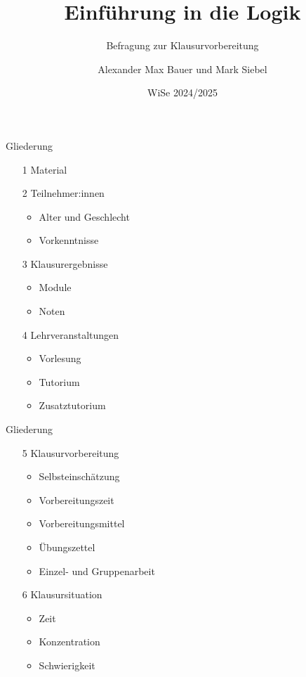 \documentclass[xcolor=table,9pt,aspectratio=169]{beamer}
\title{Einführung in die Logik}
\subtitle{Befragung zur Klausurvorbereitung}
\author{Alexander Max Bauer und Mark Siebel}
\date{WiSe 2024/2025}
\begin{document}
{
\begin{frame}
   \maketitle
\end{frame}
}


\begin{frame}{\vspace*{10mm}Gliederung}
\begin{itemize}
   \item[1] Material
   \item[2] Teilnehmer:innen
   \begin{itemize}
      \item Alter und Geschlecht
      \item Vorkenntnisse
   \end{itemize}
   \item[3] Klausurergebnisse
   \begin{itemize}
      \item Module
      \item Noten
   \end{itemize}
   \item[4] Lehrveranstaltungen
   \begin{itemize}
      \item Vorlesung
      \item Tutorium
      \item Zusatztutorium
   \end{itemize}
\end{itemize}
\end{frame}


\begin{frame}{\vspace*{10mm}Gliederung}
\begin{itemize}
   \item[5] Klausurvorbereitung
   \begin{itemize}
      \item Selbsteinschätzung
      \item Vorbereitungszeit
      \item Vorbereitungsmittel
      \item Übungszettel
      \item Einzel- und Gruppenarbeit
   \end{itemize}
   \item[6] Klausursituation
   \begin{itemize}
      \item Zeit
      \item Konzentration
      \item Schwierigkeit
   \end{itemize}
\end{itemize}
\end{frame}
\end{document}
